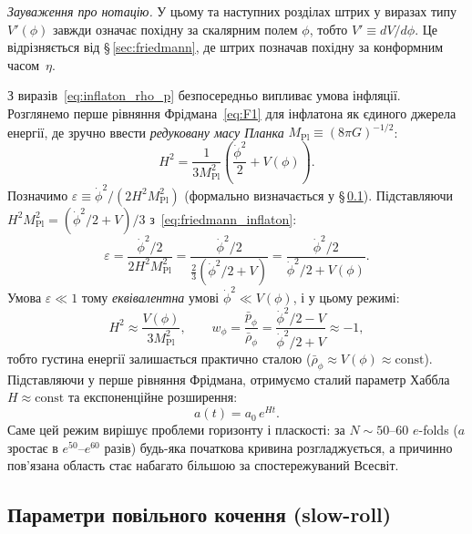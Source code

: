 \documentclass[12pt, a4paper]{article}
\begin{document}
\noindent
\textit{Зауваження про нотацію.} У цьому та наступних розділах
штрих у виразах типу $V'(\phi)$ завжди означає похідну за
скалярним полем $\phi$, тобто $V' \equiv dV/d\phi$. Це відрізняється
від §\,\ref{sec:friedmann}, де штрих позначав похідну за конформним
часом~$\eta$.

З виразів~\eqref{eq:inflaton_rho_p} безпосередньо випливає умова
інфляції. Розглянемо перше рівняння Фрідмана~\eqref{eq:F1} для
інфлатона як єдиного джерела енергії, де зручно ввести
\emph{редуковану масу Планка} $M_\mathrm{Pl} \equiv (8\pi G)^{-1/2}$:
\begin{equation}\label{eq:friedmann_inflaton}
  H^2 = \frac{1}{3M_\mathrm{Pl}^2}
        \left(\frac{\dot\phi^2}{2} + V(\phi)\right).
\end{equation}
Позначимо $\varepsilon \equiv \dot\phi^2/(2H^2 M_\mathrm{Pl}^2)$
(формально визначається у §\,\ref{subsec:slowroll}).
Підставляючи $H^2 M_\mathrm{Pl}^2 = (\dot\phi^2/2 + V)/3$
з~\eqref{eq:friedmann_inflaton}:
\begin{equation*}
  \varepsilon
    = \frac{\dot\phi^2/2}{2H^2 M_\mathrm{Pl}^2}
    = \frac{\dot\phi^2/2}{\tfrac{2}{3}(\dot\phi^2/2 + V)}
    = \frac{\dot\phi^2/2}{\dot\phi^2/2 + V(\phi)}.
\end{equation*}
Умова $\varepsilon \ll 1$ тому \emph{еквівалентна} умові
$\dot\phi^2 \ll V(\phi)$, і у цьому режимі:
\begin{equation*}
  H^2 \approx \frac{V(\phi)}{3M_\mathrm{Pl}^2}, \qquad
  w_\phi = \frac{\bar{p}_\phi}{\bar{\rho}_\phi}
         = \frac{\dot\phi^2/2 - V}{\dot\phi^2/2 + V} \approx -1,
\end{equation*}
тобто густина енергії залишається практично сталою
($\bar{\rho}_\phi \approx V(\phi) \approx \mathrm{const}$).
Підставляючи у перше рівняння Фрідмана, отримуємо
сталий параметр Хаббла $H \approx \mathrm{const}$ та
експоненційне розширення:
\begin{equation}\label{eq:a_exponential}
  a(t) = a_0\,e^{Ht}.
\end{equation}
Саме цей режим вирішує проблеми горизонту і пласкості: за $N \sim
50$--$60$ $e$-folds ($a$ зростає в $e^{50}$--$e^{60}$ разів)
будь-яка початкова кривина розгладжується, а причинно пов'язана
область стає набагато більшою за спостережуваний Всесвіт.

\subsection{Параметри повільного кочення (slow-roll)}
\label{subsec:slowroll}
\end{document}
